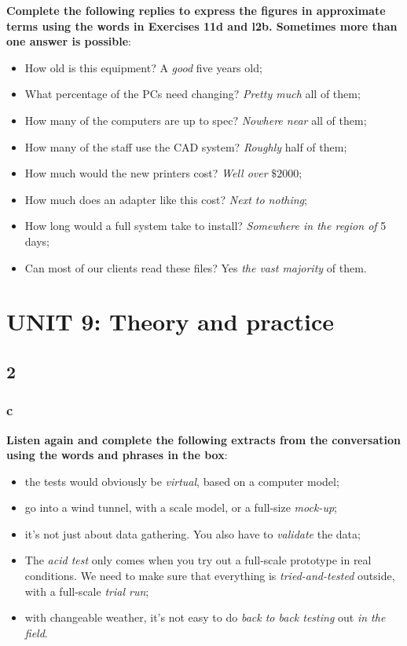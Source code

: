 \textbf{Complete the following replies to express the figures in approximate terms using the words in Exercises 11d and l2b. Sometimes more than one answer is possible}:

\begin{itemize}

\item How old is this equipment? A \textit{good} five years old;
\item What percentage of the PCs need changing? \textit{Pretty much} all of them;
\item How many of the computers are up to spec? \textit{Nowhere near} all of them;
\item How many of the staff use the CAD system? \textit{Roughly} half of them;
\item How much would the new printers cost? \textit{Well over} $\$2000$;
\item How much does an adapter like this cost? \textit{Next to nothing};
\item How long would a full system take to install? \textit{Somewhere in the region of} 5 days;
\item Can most of our clients read these files? Yes \textit{the vast majority} of them.

\end{itemize}


\section{UNIT 9: Theory and practice}

\subsection{2}

\subsubsection{c}

\textbf{Listen again and complete the following extracts from the conversation using the words and phrases in the box}:

\begin{itemize}

\item the tests would obviously be \textit{virtual}, based on a computer model;
\item go into a wind tunnel, with a scale model, or a full-size \textit{mock-up};
\item it's not just about data gathering. You also have to \textit{validate} the data;
\item The \textit{acid test} only comes when you try out a full-scale prototype in real conditions. We need to make sure that everything is \textit{tried-and-tested} outside, with a full-scale \textit{trial run};
\item with changeable weather, it's not easy to do \textit{back to back testing} out \textit{in the field}.

\end{itemize}

